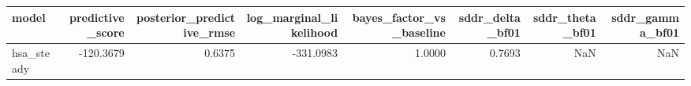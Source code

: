 \begin{tabular}{lrrrrrrr}
\toprule
model & predictive\_score & posterior\_predictive\_rmse & log\_marginal\_likelihood & bayes\_factor\_vs\_baseline & sddr\_delta\_bf01 & sddr\_theta\_bf01 & sddr\_gamma\_bf01 \\
\midrule
hsa\_steady & -120.3679 & 0.6375 & -331.0983 & 1.0000 & 0.7693 & NaN & NaN \\
\bottomrule
\end{tabular}
